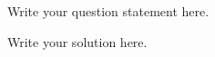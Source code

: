 \begin{question}
Write your question statement here.

\begin{solution}
Write your solution here.
\end{solution}
\end{question}
